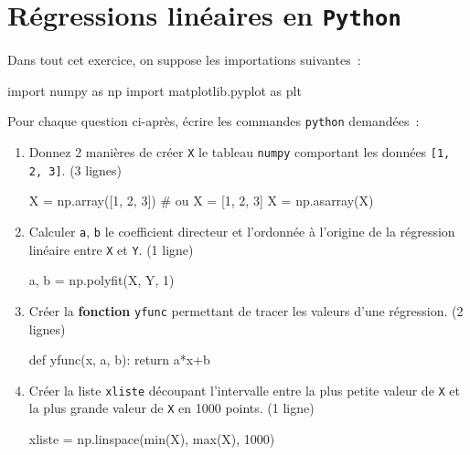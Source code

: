 \documentclass[a4paper, 12pt, final, garamond]{book}
\begin{document}
\setcounter{chapter}{1}

\chapter{R\'egressions lin\'eaires en \texttt{Python}}

Dans tout cet exercice, on suppose les importations suivantes~:
\begin{python}
import numpy as np
import matplotlib.pyplot as plt
\end{python}
Pour chaque question ci-après, écrire les commandes \texttt{python} demandées~:

\begin{enumerate}[label=\sqenumi]
    \item Donnez 2 manières de créer \texttt{X} le tableau \texttt{numpy}
        comportant les données \texttt{[1, 2, 3]}. \hfill (3 lignes) \smallbreak
        \begin{solution}
            \begin{python}
X = np.array([1, 2, 3])
# ou
X = [1, 2, 3]
X = np.asarray(X)
            \end{python}
\end{solution}
    \item Calculer \texttt{a}, \texttt{b} le coefficient directeur et l'ordonnée
        à l'origine de la régression linéaire entre \texttt{X} et \texttt{Y}.
        \hfill (1 ligne)
        \begin{solution}
            \begin{python}
a, b = np.polyfit(X, Y, 1)
            \end{python}
\end{solution}

    \item Créer la \textbf{fonction} \texttt{yfunc} permettant de tracer les valeurs
        d'une régression. \hfill (2 lignes)
        \begin{solution}
            \begin{python}
def yfunc(x, a, b):
    return a*x+b
            \end{python}
\end{solution}

    \item Créer la liste \texttt{xliste} découpant l'intervalle entre la plus petite
        valeur de \texttt{X} et la plus grande valeur de \texttt{X} en 1000
        points. \hfill (1 ligne)
        \begin{solution}
            \begin{python}
xliste = np.linspace(min(X), max(X), 1000)
            \end{python}
\end{solution}


\end{enumerate}
\end{document}
